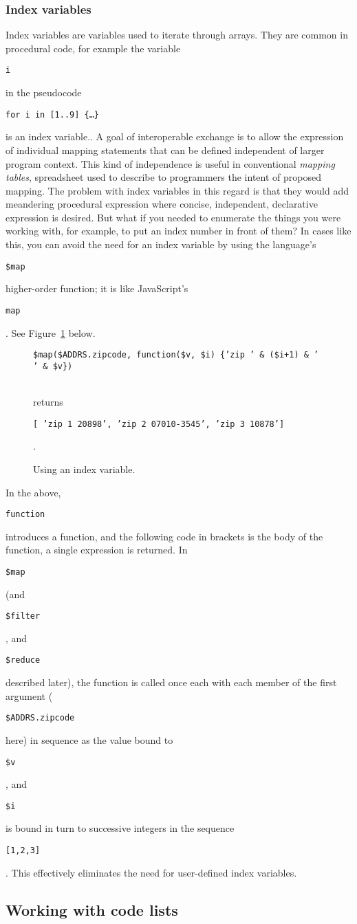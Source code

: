 \documentclass[9pt,letterpaper]{article}
\newcommand{\stt}[1]{\begin{footnotesize}\texttt{#1}\end{footnotesize}}
\begin{document}
\subsubsection{Index variables} %
Index variables are variables used to iterate through arrays.
They are common in procedural code, for example the variable \stt{i} in the pseudocode \stt{for i in [1..9] \{\ldots \}} is an index variable..
A goal of interoperable exchange is to allow the expression of individual mapping statements that can be defined independent of larger program context.
This kind of independence is useful in conventional \textit{mapping tables}, spreadsheet used to describe to programmers the intent of proposed mapping.
The problem with index variables in this regard is that they would add meandering procedural expression where concise, independent, declarative expression is desired.
But what if you needed to enumerate the things you were working with, for example, to put an index number in front of them?
In cases like this, you can avoid the need for an index variable by using the language's \stt{\$map} higher-order function; it is like JavaScript's \stt{map}.
See Figure~\ref{code:index-in-map} below.

\begin{figure}[H]
    \caption{Using an index variable.}
    \label{code:index-in-map}
\vspace{3mm}
    \stt{\$map(\$ADDRS.zipcode, function(\$v, \$i) \{'zip ' \& (\$i+1) \& ' ' \& \$v\})}\\
\vspace{3mm}
returns \\
 \stt{[ 'zip 1 20898', 'zip 2 07010-3545', 'zip 3 10878']}.
\end{figure}

In the above, \stt{function} introduces a function, and the following code in brackets is the body of the function, a single expression is returned.
In \stt{\$map} (and \stt{\$filter}, and \stt{\$reduce} described later), the function is called once each with each member of the first argument (\stt{\$ADDRS.zipcode} here) in sequence
as the value bound to \stt{\$v}, and \stt{\$i} is bound in turn to successive integers in the sequence \stt{[1,2,3]}.
This effectively eliminates the need for user-defined index variables.

\subsection{Working with code lists}
\end{document}
